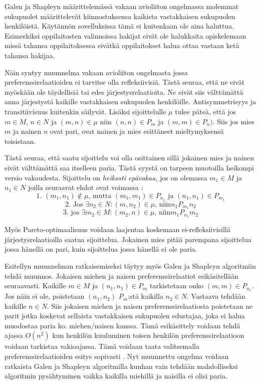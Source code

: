 \documentclass[gradu, twoside]{tktltiki}
\begin{document}
Galen ja Shapleyn määrittelemässä vakaan avioliiton ongelmassa
molemmat sukupuolet määrittelevät kiinnostuksensa kaikista
vastakkaisen sukupuolen henkilöistä. Käytännön sovelluksissa tämä ei
kuitenkaan ole aina haluttua. Esimerkiksi oppilaitosten valinnoissa
hakijat eivät ole halukkaita opiskelemaan missä tahansa
oppilaitoksessa eivätkä oppilaitokset halua ottaa vastaan ketä tahansa
hakijaa.

Näin syntyy muunnelma vakaan avioliiton ongelmasta jossa
preferenssirelaatioiden ei tarvitse olla refleksiivisiä. Tästä seuraa,
että ne eivät myöskään ole täydellisiä tai edes järjestysrelaatioita.
Ne eivät siis välttämättä anna järjestystä kaikille vastakkaisen
sukupuolen henkilöille. Antisymmetrisyys ja transitiivisuus kuitenkin
säilyvät. Lisäksi sijoittelulle $\mu$ tulee päteä, että jos $m \in M$,
$n \in N$ ja $(m, n) \in \mu$ niin $(n, n) \in P_m$ ja $(m, m) \in
P_n)$. Siis jos mies $m$ ja nainen $n$ ovat pari, ovat nainen ja mies
esittäneet mieltymyksensä toisistaan.

Tästä seuraa, että saatu sijoittelu voi olla osittainen sillä jokainen
mies ja nainen eivät välttämättä saa itselleen paria. Tästä syystä on
tarpeen muotoilla heikompi versio vakaudesta. Sijoittelu on
\emph{heikosti epävakaa}, jos on olemassa $m_1 \in M$ ja $n_1 \in N$
joilla seuraavat ehdot ovat voimassa \cite{gusfield89}:
\[
\text{1. }(m_1, n_1) \notin \mu \text{, mutta } (m_1, m_1) \in P_{n_1}
\text{ ja } (n_1, n_1) \in P_{m_1}
\]
\[
\text{2. Jos }\exists n_2 \in N: (m, n_2) \in \mu \text{, niin
}n_1P_{m_1}n_2
\]
\[
\text{3. jos }\exists m_2 \in M: (m_2, n) \in \mu \text{, niin
}m_1P_{n_1}m_2
\]

Myös Pareto-optimaalisuus voidaan laajentaa koskemaan
ei-refleksiivisillä järjestysrelaatioilla saatua sijoittelua. Jokainen
mies pitää parempana sijoittelua jossa hänellä on pari, kuin
sijoittelua jossa hänellä ei ole paria. \cite{gusfield89}

Esitellyn muunnelman ratkaisemiseksi täytyy myös Galen ja Shapleyn
algoritmiin tehdä muunnos. Jokaisen miehen ja naisen
preferenssirelaatiot esikäsitellään seuraavasti. Kaikille $m \in M$ ja
$(n_1, n_1) \in P_m$ tarkistetaan onko $(m, m) \in P_{n_1}$. Jos näin
ei ole, poistetaan $(n_1, n_2)$ $P_m$:stä kaikilla $n_2 \in N$.
\cite{gusfield89} Vastaava tehdään kaikille $n \in N$. Siis jokaisen
miehen ja naisen preferenssirelaatiosta poistetaan ne parit jotka
koskevat sellaista vastakkaisen sukupuolen edustajaa, joka ei halua
muodostaa paria ko. miehen/naisen kanssa. Tämä esikäsittely voidaan
tehdä ajassa $O(n^2)$ kun henkilön kuuluminen toisen henkilön
preferenssirelaatioon voidaan tarkistaa vakioajassa. Tämä voidaan
taata valitsemalla preferenssirelaatioiden esitys sopivasti
\cite{gusfield89}. Nyt muunnettu ongelma voidaan ratkaista Galen ja
Shapleyn algoritmilla kunhan vain tehdään mahdolliseksi algoritmin
pysähtyminen vaikka kaikilla miehillä ja naisilla ei olisi paria.
\end{document}
